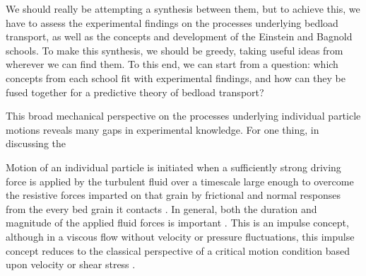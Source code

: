 \documentclass{article}
\begin{document}
{We should really be attempting a synthesis between them, but to achieve this, we have to assess the experimental findings on the processes underlying bedload transport, as well as the concepts and development of the Einstein and Bagnold schools.  
To make this synthesis, we should be greedy, taking useful ideas from wherever we can find them. 
To this end, we can start from a question: which concepts from each school fit with experimental findings, and how can they be fused together for a predictive theory of bedload transport?  




This broad mechanical perspective on the processes underlying individual particle motions reveals many gaps in experimental knowledge. 
For one thing, in discussing the 






















Motion of an individual particle is initiated when a sufficiently strong driving force is applied by the turbulent fluid over a timescale large enough to overcome the resistive forces imparted on that grain by frictional and normal responses from the every bed grain it contacts \citep{Paintal1971, Valyrakis2010, Celik2014}. 
In general, both the duration and magnitude of the applied fluid forces is important \citep{Diplas2008, Valkyrus2010, Celik2014}. 
This is an impulse concept, although in a viscous flow without velocity or pressure fluctuations, this impulse concept reduces to the classical perspective of a critical motion condition based upon velocity or shear stress \citep{Shields1936, Buffington1997}. 

}
\end{document}
